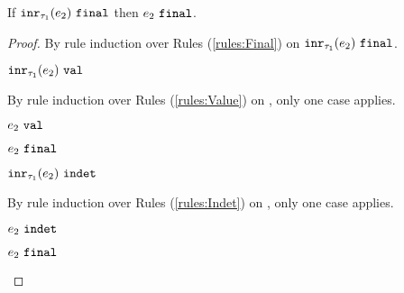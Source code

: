 \begin{lemma}
  \label{lem:inr-final}
  If $\mathtt{inr}_{\tau_1}({e_2}) ~\mathtt{final}$ then $e_2 ~\mathtt{final}$.
\end{lemma}
\begin{proof}
By rule induction over Rules (\ref{rules:Final}) on $\mathtt{inr}_{\tau_1}({e_2}) ~\mathtt{final}$.
\begin{byCases}
\item[\text{(\ref{rule:FVal})}]
    \begin{pfsteps*}
    \item $\mathtt{inr}_{\tau_1}({e_2}) ~\mathtt{val}$  
    \end{pfsteps*}
    By rule induction over Rules (\ref{rules:Value}) on , only one case applies.
    \begin{byCases}
    \item[\text{(\ref{rule:VInl})}]
        \begin{pfsteps*}
        \item $e_2 ~\mathtt{val}$  
        \item $e_2 ~\mathtt{final}$ 
        \end{pfsteps*}
    \end{byCases}
\item[\text{(\ref{rule:FIndet})}]
    \begin{pfsteps*}
    \item $\mathtt{inr}_{\tau_1}({e_2}) ~\mathtt{indet}$  
    \end{pfsteps*}
    By rule induction over Rules (\ref{rules:Indet}) on , only one case applies.
    \begin{byCases}
    \item[\text{(\ref{rule:IInl})}]
        \begin{pfsteps*}
        \item $e_2 ~\mathtt{indet}$  
        \item $e_2 ~\mathtt{final}$ 
        \end{pfsteps*}
    \end{byCases}
\end{byCases}
\resetpfcounter
\end{proof}

